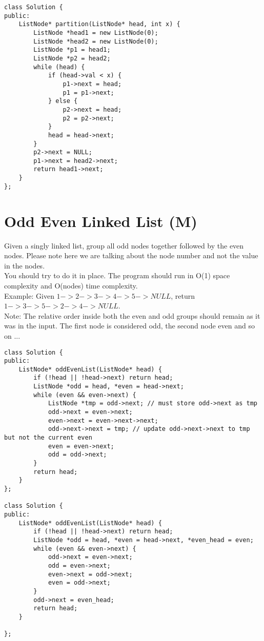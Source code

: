\begin{lstlisting}
class Solution {
public:
    ListNode* partition(ListNode* head, int x) {
        ListNode *head1 = new ListNode(0);
        ListNode *head2 = new ListNode(0);
        ListNode *p1 = head1;
        ListNode *p2 = head2;
        while (head) {
            if (head->val < x) {
                p1->next = head;
                p1 = p1->next;
            } else {
                p2->next = head;
                p2 = p2->next;
            }
            head = head->next;
        }
        p2->next = NULL;
        p1->next = head2->next;
        return head1->next;
    }
};
\end{lstlisting}


\section{Odd Even Linked List (M)}
Given a singly linked list, group all odd nodes together followed by the even nodes. Please note here we are talking about the node number and not the value in the nodes.\\

You should try to do it in place. The program should run in O(1) space complexity and O(nodes) time complexity.\\

Example:
Given $1->2->3->4->5->NULL$, return $1->3->5->2->4->NULL$.\\

Note:
The relative order inside both the even and odd groups should remain as it was in the input.
The first node is considered odd, the second node even and so on ... \\

\begin{lstlisting}
class Solution {
public:
    ListNode* oddEvenList(ListNode* head) {
        if (!head || !head->next) return head;
        ListNode *odd = head, *even = head->next;
        while (even && even->next) {
            ListNode *tmp = odd->next; // must store odd->next as tmp
            odd->next = even->next;
            even->next = even->next->next;
            odd->next->next = tmp; // update odd->next->next to tmp but not the current even
            even = even->next;
            odd = odd->next;
        }
        return head;
    }
};

class Solution {
public:
    ListNode* oddEvenList(ListNode* head) {
        if (!head || !head->next) return head;
        ListNode *odd = head, *even = head->next, *even_head = even;
        while (even && even->next) {
            odd->next = even->next;
            odd = even->next;
            even->next = odd->next;
            even = odd->next;
        }
        odd->next = even_head;
        return head;
    }

};
\end{lstlisting}


